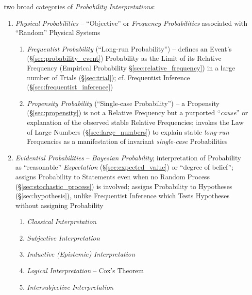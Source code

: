 two broad categories of \emph{Probability Interpretations}:
\begin{enumerate}
  \item \emph{Physical Probabilities} -- ``Objective'' or \emph{Frequency
    Probabilities} associated with ``Random'' Physical Systems
    \begin{enumerate}
      \item \emph{Frequentist Probability} (``Long-run Probability'') -- defines
        an Event's (\S\ref{sec:probability_event}) Probability as the Limit of
        its Relative Frequency (Empirical Probability
        \S\ref{sec:relative_frequency}) in a large number of Trials
        (\S\ref{sec:trial}); cf. Frequentist Inference
        (\S\ref{sec:frequentist_inference})
      \item \emph{Propensity Probability} (``Single-case Probability'') -- a
        Propensity (\S\ref{sec:propensity}) is not a Relative Frequency but a
        purported ``\emph{cause}'' or explanation of the observed stable
        Relative Frequencies; invokes the Law of Large Numbers
        (\S\ref{sec:large_numbers}) to explain stable \emph{long-run}
        Frequencies as a manifestation of invariant \emph{single-case}
        Probabilities
    \end{enumerate}
  \item \emph{Evidential Probabilities} -- \emph{Bayesian Probability};
    interpretation of Probability as ``reasonable'' \emph{Expectation}
    (\S\ref{sec:expected_value}) or ``degree of belief''; assigns Probability to
    Statements even when no Random Process (\S\ref{sec:stochastic_process}) is
    involved; assigns Probability to Hypotheses (\S\ref{sec:hypothesis}), unlike
    Frequentist Inference which Tests Hypotheses without assigning Probability
    \begin{enumerate}
      \item \emph{Classical Interpretation}
      \item \emph{Subjective Interpretation}
      \item \emph{Inductive (Epistemic) Interpretation}
      \item \emph{Logical Interpretation} -- Cox's Theorem
      \item \emph{Intersubjective Interpretation}
    \end{enumerate}
\end{enumerate}

